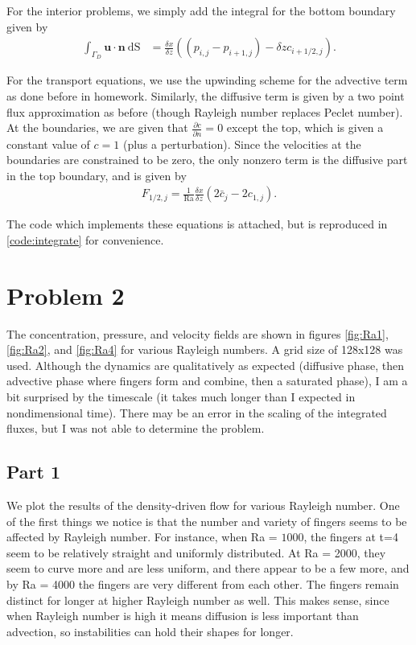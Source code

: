 \documentclass{article}
\begin{document}
For the interior problems, we simply add the integral for the bottom boundary given by
\begin{align}
\int_{\Gamma_{D}} \mathbf{u} \cdot \mathbf{n}\ \mathrm{dS} &= \frac{\delta x}{\delta z} \left( (p_{i,j} - p_{i+1,j}) - \delta z c_{i+1/2,j} \right).
\end{align}

For the transport equations, we use the upwinding scheme for the advective term as done before in homework.
Similarly, the diffusive term is given by a two point flux approximation as before (though Rayleigh number replaces Peclet number).
At the boundaries, we are given that $\frac{\partial c}{\partial n} = 0$ except the top, which is given a constant value of $c = 1$ (plus a perturbation).
Since the velocities at the boundaries are constrained to be zero, the only nonzero term is the diffusive part in the top boundary, and is given by
\begin{align}
F_{1/2, j} = \frac{1}{\mathrm{Ra}} \frac{\delta x} {\delta z} \left( 2 \bar{c}_{j} - 2 c_{1, j} \right).
\end{align}

The code which implements these equations is attached, but is reproduced in \cref{code:integrate} for convenience.

\section{Problem 2}
The concentration, pressure, and velocity fields are shown in figures \ref{fig:Ra1}, \ref{fig:Ra2}, and \ref{fig:Ra4} for various Rayleigh numbers. A grid size of 128x128 was used.
Although the dynamics are qualitatively as expected (diffusive phase, then advective phase where fingers form and combine, then a saturated phase), I am a bit surprised by the timescale (it takes much longer than I expected in nondimensional time).
There may be an error in the scaling of the integrated fluxes, but I was not able to determine the problem.

\subsection{Part 1}
We plot the results of the density-driven flow for various Rayleigh number.
One of the first things we notice is that the number and variety of fingers seems to be affected by Rayleigh number.
For instance, when Ra = $1000$, the fingers at t=4 seem to be relatively straight and uniformly distributed.
At Ra = 2000, they seem to curve more and are less uniform, and there appear to be a few more, and by Ra = 4000 the fingers are very different from each other.
The fingers remain distinct for longer at higher Rayleigh number as well.
This makes sense, since when Rayleigh number is high it means diffusion is less important than advection, so instabilities can hold their shapes for longer.
\end{document}
